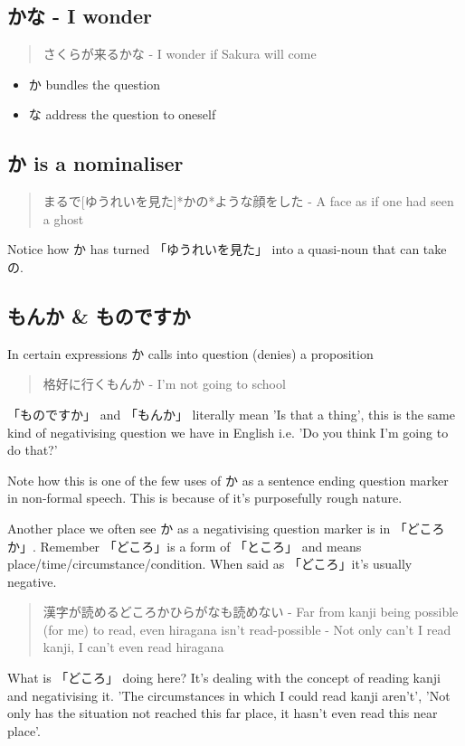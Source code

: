 \documentclass[11pt]{article}
\begin{document}
\subsection{かな - I wonder}
\label{sec:orge87d2ac}
\begin{quote}
さくらが来るかな - I wonder if Sakura will come
\end{quote}
\begin{itemize}
\item か bundles the question
\item な address the question to oneself
\end{itemize}


\subsection{か is a nominaliser}
\label{sec:org97bc242}
\begin{quote}
まるで[ゆうれいを見た]*かの*ような顔をした - A face as if one had seen a ghost
\end{quote}
Notice how か has turned 「ゆうれいを見た」 into a quasi-noun that can take の.

\subsection{もんか \& ものですか}
\label{sec:orgbee7900}
In certain expressions か calls into question (denies) a proposition
\begin{quote}
格好に行くもんか - I'm not going to school
\end{quote}

「ものですか」 and 「もんか」 literally mean 'Is that a thing', this is the same kind of negativising question we have in English i.e. 'Do you think I'm going to do that?'

Note how this is one of the few uses of か as a sentence ending question marker in non-formal speech. This is because of it's purposefully rough nature.

Another place we often see か as a negativising question marker is in 「どころか」. Remember 「どころ」is a form of 「ところ」 and means place/time/circumstance/condition. When said as 「どころ」it's usually negative.
\begin{quote}
漢字が読めるどころかひらがなも読めない - Far from kanji being possible (for me) to read, even hiragana isn't read-possible - Not only can't I read kanji, I can't even read hiragana
\end{quote}
What is 「どころ」 doing here? It's dealing with the concept of reading kanji and negativising it. 'The circumstances in which I could read kanji aren't', 'Not only has the situation not reached this far place, it hasn't even read this near place'.
\end{document}

